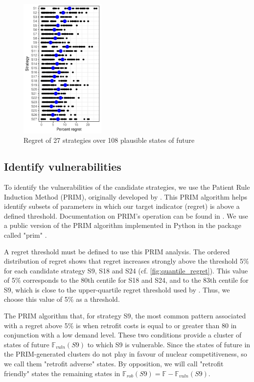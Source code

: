 \begin{figure}[!ht]
	\centering
	\includegraphics[height=7cm]{figures/regret.pdf}
	\caption{Regret of 27 strategies over 108 plausible states of future}
	\label{fig:regret}
\end{figure}

\subsection{Identify vulnerabilities}

To identify the vulnerabilities of the candidate strategies, we use the Patient Rule Induction Method (PRIM), originally developed by \citet{Friedman1999}. This PRIM algorithm helps identify subsets of parameters in which our target indicator (regret) is above a defined threshold. Documentation on PRIM's operation can be found in \citet{Bryant2010}. We use a public version of the PRIM algorithm implemented in Python in the package called "prim" \citep{Hadka}. 

A regret threshold must be defined to use this PRIM analysis. The ordered distribution of regret shows that regret increases strongly above the threshold 5\% for each candidate strategy S9, S18 and S24 (cf. \cref{fig:quantile_regret}). This value of 5\% corresponds to the 80th centile for S18 and S24, and to the 83th centile for S9, which is close to the upper-quartile regret threshold used by \citet{Nahmmacher2016}. Thus, we choose this value of 5\% as a threshold. 

The PRIM algorithm that, for strategy S9, the most common pattern associated with a regret above 5\% is when retrofit costs is equal to or greater than 80 \emwh in conjunction with a low demand level. These two conditions provide a cluster of states of future $\mathbb{F}_{vuln}(S9)$ to which S9 is vulnerable. Since the states of future in the PRIM-generated clusters do not play in favour of nuclear competitiveness, so we call them "retrofit adverse" states. By opposition, we will call "retrofit friendly" states the remaining states in $\mathbb{F}_{rob}(S9) = \mathbb{F} - \mathbb{F}_{vuln}(S9)$.  

